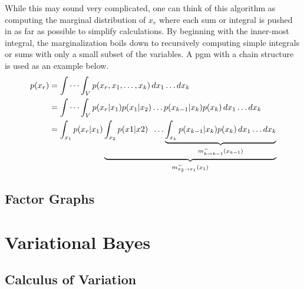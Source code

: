 While this may sound very complicated, one can think of this algorithm as computing the marginal distribution of $x_r$ where each sum or integral is pushed in as far as possible to simplify calculations. By beginning with the inner-most integral, the marginalization boils down to recursively computing simple integrals or sums with only a small subset of the variables. A \acrshort{pgm} with a chain structure is used as an example below.
\begin{align*}
p(x_r) &= \idotsint_V p(x_r, x_1,\dots,x_k) \,dx_1 \dots dx_k\\
&= \idotsint_V p(x_r | x_1)p(x_1|x_2)\dots p(x_{k-1} | x_k)p(x_k) \, dx_1 \dots dx_k\\
&= \int_{x_1} p(x_r | x_1)\underbrace{\int_{x_2}p(x1 | x2) \; \;  \dots \underbrace{\int_{x_k} p(x_{k-1} | x_k)p(x_k) \, dx_1 \dots dx_k}_{m_{k\to k-1}^-(x_{k-1})}}_{m_{x_2 \to x_1}^-(x_1)}
\end{align*}





\subsection{Factor Graphs}
\section{Variational Bayes}
\subsection{Calculus of Variation}